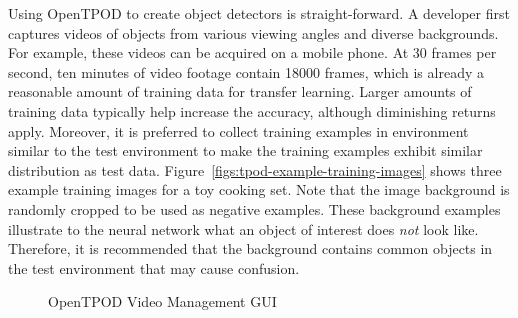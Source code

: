 Using OpenTPOD to create object detectors is straight-forward. A developer first
captures videos of objects from various viewing angles and diverse backgrounds.
For example, these videos can be acquired on a mobile phone. At 30 frames per
second, ten minutes of video footage contain 18000 frames, which is already a
reasonable amount of training data for transfer learning. Larger amounts of
training data typically help increase the accuracy, although diminishing returns
apply. Moreover, it is preferred to collect training examples in environment
similar to the test environment to make the training examples exhibit similar
distribution as test data. Figure~\ref{figs:tpod-example-training-images} shows
three example training images for a toy cooking set. Note that the image
background is randomly cropped to be used as negative examples. These
background examples illustrate to the neural network what an object of interest
does \textit{not} look like. Therefore, it is recommended that the background contains
common objects in the test environment that may cause confusion.


\begin{figure}[]
  \centering
    \caption{OpenTPOD Video Management GUI}
  \label{figs:tpod-video-gui}
\end{figure}

